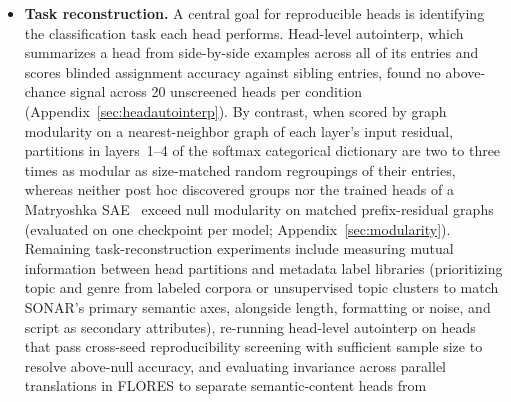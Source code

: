 \begin{itemize}
across the full stack for all steering directions (random included), vs.\
66\% in the 32-entry stack. Although its raw logit margins are $34\times$
larger than the 32-entry stack's, raw margin scale alone is not the
cause, as raw margins doubled between steps 370k and 739k while the
first-order flip rate remained unchanged because overall logit norms
scaled proportionally. Neither training duration nor the $\mathrm{KL}_m$
weight explains the reduction: at step 370k (matching the 32-entry
stack's full training horizon), both the first-order flip prediction and
empirical collateral were already at 13\% and 17--19\%, and the
batch-mean uniformity weight matches the 32-entry stack's effective
per-head weight (since $\mathrm{KL}_m$ averages across heads, a weight of
$5\times10^{-4}$ over 380 heads applies the same per-head penalty as
$10^{-4}$ over 76 heads). However, because \texttt{ste\_k2\_h380} was
trained on a single seed at half the batch size (and thus under noisier
per-step gradients), a batch-matched multi-seed comparison is still
needed to isolate the effect of $k$.
\item \textbf{Task reconstruction.} A central goal for reproducible heads
is identifying the classification task each head performs. Head-level autointerp, which summarizes a head from side-by-side examples
across all of its entries and scores blinded assignment accuracy against
sibling entries, found no above-chance signal across 20 unscreened heads
per condition (Appendix~\ref{sec:headautointerp}). By contrast, when
scored by graph modularity on a nearest-neighbor graph of each layer's
input residual, partitions in layers~1--4 of the softmax categorical
dictionary are two to three times as modular as size-matched random
regroupings of their entries, whereas neither post hoc discovered groups
nor the trained heads of a Matryoshka SAE~\cite{bussmann2025} exceed null
modularity on matched prefix-residual graphs (evaluated on one checkpoint
per model; Appendix~\ref{sec:modularity}). Remaining task-reconstruction
experiments include measuring mutual information between head partitions
and metadata label libraries (prioritizing topic and genre from labeled
corpora or unsupervised topic clusters to match SONAR's primary semantic
axes, alongside length, formatting or noise, and script as secondary
attributes), re-running head-level autointerp on heads that pass
cross-seed reproducibility screening with sufficient sample size to
resolve above-null accuracy, and evaluating invariance across parallel
translations in FLORES to separate semantic-content heads from

\end{itemize}
